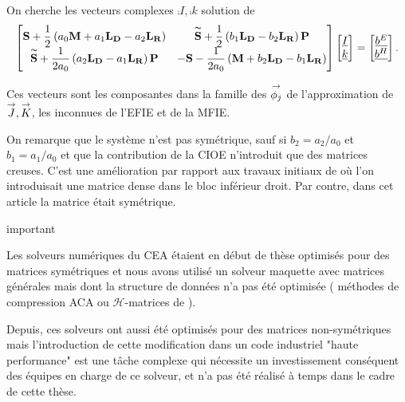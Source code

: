   \begin{prop}
    \label{prop:form_int:ci3}
    On cherche les vecteurs complexes \(\comp{I},\comp{k}\) solution de
    \begin{equation*}
      \begin{bmatrix}
        \mathbf{S} +  \dfrac{1}{2} \left(a_0 \mathbf{M} + a_1 \mathbf{L_D} - a_2 \mathbf{L_R}\right) & \mathbf{\overset{\thicksim}{S}} + \dfrac{1}{2}\left(b_1 \mathbf{L_D} - b_2 \mathbf{L_R} \right)\mathbf{P} \\
        \mathbf{\overset{\thicksim}{S}} + \dfrac{1}{2a_0}\left( a_2 \mathbf{L_D} - a_1 \mathbf{L_R} \right)\mathbf{P} & -\mathbf{S} - \dfrac{1}{2a_0}\left(\mathbf{M} + b_2 \mathbf{L_D} - b_1 \mathbf{L_R} \right)
      \end{bmatrix}
      \begin{bmatrix}
        {\underline{I}}\\
        {\underline{k}}
      \end{bmatrix}
      =
      \begin{bmatrix}
        {\underline{b^E}}\\
        {\underline{b^H}}
      \end{bmatrix}.
    \end{equation*}

    Ces vecteurs sont les composantes dans la famille des \({\overset{\rightarrow}{\phi_j}}\) de l'approximation de \({\overset{\rightarrow}{J}},{\overset{\rightarrow}{K}}\), les inconnues de l'EFIE et de la MFIE.
  \end{prop}

  On remarque que le système n'est pas symétrique, sauf si \(b_2=a_2/a_0\) et \(b_1=a_1/a_0\) et que la contribution de la CIOE n'introduit que des matrices creuses. 
  C'est une amélioration par rapport aux travaux initiaux de \cite{stupfel_implementation_2015} où l'on introduisait une matrice dense dans le bloc inférieur droit. 
  Par contre, dans cet article la matrice était symétrique.
\begin{REM}
  important
\end{REM} 
  Les solveurs numériques du CEA étaient en début de thèse optimisés pour des matrices symétriques et nous avons utilisé un solveur maquette avec matrices générales mais dont la structure de données n'a pas été optimisée ( méthodes de compression ACA ou \(\mathcal{H}\)-matrices de \cite{lize_resolution_2014} ).
  
  Depuis, ces solveurs ont aussi été optimisés pour des matrices non-symétriques mais l'introduction de cette modification dans un code industriel "haute performance" est une tâche complexe qui nécessite un investissement conséquent des équipes en charge de ce solveur, et n'a pas été réalisé à temps dans le cadre de cette thèse.